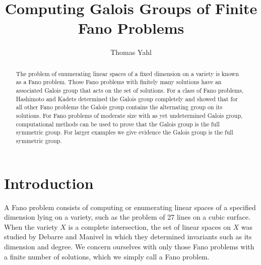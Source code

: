 \documentclass[12pt]{amsart}
\title{Computing Galois Groups of Finite Fano Problems}
\author[T.~Yahl]{Thomas Yahl}
\theoremstyle{definition}
\begin{document}
%
%
%
%
%
%
%



\begin{abstract}
The problem of enumerating linear spaces of a fixed dimension on a variety is known as a Fano problem. Those Fano problems with finitely many solutions have an associated Galois group that acts on the set of solutions. For a class of Fano problems, Hashimoto and Kadets determined the Galois group completely and showed that for all other Fano problems the Galois group contains the alternating group on its solutions. For Fano problems of moderate size with as yet undetermined Galois group, computational methods can be used to prove that the Galois group is the full symmetric group. For larger examples we give evidence the Galois group is the full symmetric group.
\end{abstract}

\maketitle

\section{Introduction}
%
A Fano problem consists of computing or enumerating linear spaces of a specified dimension lying on a variety, such as the problem of 27 lines on a cubic surface. When the variety $X$ is a complete intersection, the set of linear spaces on $X$ was studied by Debarre and Manivel \cite{DM} in which they determined invariants such as its dimension and degree. We concern ourselves with only those Fano problems with a finite number of solutions, which we simply call a Fano problem. 
\end{document}
